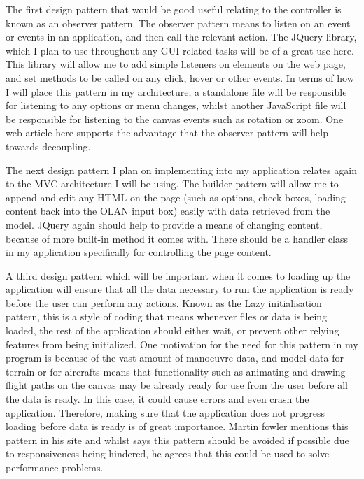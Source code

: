 The first design pattern that would be good useful relating to the controller is known as an observer pattern. The observer pattern means to listen on an event or events in an application, and then call the relevant action. The JQuery library, which I plan to use throughout any GUI related tasks will be of a great use here. This library will allow me to add simple listeners on elements on the web page, and set methods to be called on any click, hover or other events. In terms of how I will place this pattern in my architecture, a standalone file will be responsible for listening to any options or menu changes, whilst another JavaScript file will be responsible for listening to the canvas events such as rotation or zoom. One web article here \cite{observer} supports the advantage that the observer pattern will help towards decoupling.

The next design pattern I plan on implementing into my application relates again to the MVC architecture I will be using. The builder pattern will allow me to append and edit any HTML on the page (such as options, check-boxes, loading content back into the OLAN input box) easily with data retrieved from the model. JQuery again should help to provide a means of changing content, because of more built-in method it comes with. There should be a handler class in my application specifically for controlling the page content.

A third design pattern which will be important when it comes to loading up the application will ensure that all the data necessary to run the application is ready before the user can perform any actions. Known as the Lazy initialisation pattern, this is a style of coding that means whenever files or data is being loaded, the rest of the application should either wait, or prevent other relying features from being initialized. One motivation for the need for this pattern in my program is because of the vast amount of manoeuvre data, and model data for terrain or for aircrafts means that functionality such as animating and drawing flight paths on the canvas may be already ready for use from the user before all the data is ready. In this case, it could cause errors and even crash the application. Therefore, making sure that the application does not progress loading before data is ready is of great importance. Martin fowler mentions this pattern in his site \cite{lazy_initialisation} and whilst says this pattern should be avoided if possible due to responsiveness being hindered, he agrees that this could be used to solve performance problems.

